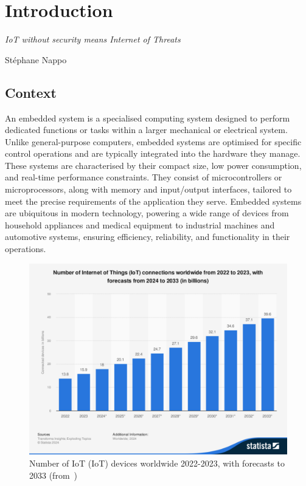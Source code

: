 \chapter{Introduction}
\label{chapter:introduction}

\epigraph{\textit{IoT without security means Internet of Threats}}{Stéphane Nappo}

\minitoc

\section{Context}
An embedded system is a specialised computing system designed to perform dedicated functions or tasks within a larger mechanical or electrical system. Unlike general-purpose computers, embedded systems are optimised for specific control operations and are typically integrated into the hardware they manage. These systems are characterised by their compact size, low power consumption, and real-time performance constraints. They consist of microcontrollers or microprocessors, along with memory and input/output interfaces, tailored to meet the precise requirements of the application they serve. Embedded systems are ubiquitous in modern technology, powering a wide range of devices from household appliances and medical equipment to industrial machines and automotive systems, ensuring efficiency, reliability, and functionality in their operations.

\begin{figure}[ht]
    \centering
    \includegraphics[width=\linewidth, trim={1.25cm 4.75cm 1cm 3.75cm}, clip]{c1_intro/img/iot_forecasts.pdf}
    \caption{Number of IoT (IoT) devices worldwide 2022-2023, with forecasts to 2033 (from~\cite{statista_iot})}
    \label{fig:iot_forecasts}
\end{figure}

